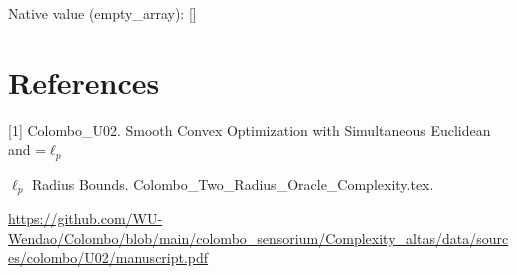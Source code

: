 \documentclass[10pt,a4paper]{article}
\newcommand{\AtlasMath}[1]{\par\begingroup\centering\setbox0=\hbox{$\displaystyle #1$}\ifdim\wd0>1.4\linewidth\typeout{ATLAS WIDE FORMULA: \the\wd0}\fi\ifdim\wd0>\linewidth\resizebox{\linewidth}{!}{\box0}\else\box0\fi\par\endgroup}
\newcommand{\AtlasInlineMath}[1]{\begingroup\setbox0=\hbox{$#1$}\ifdim\wd0>.4\linewidth\endgroup\AtlasMath{#1}\else\endgroup$#1$\fi}
\begin{document}
Native value (empty\_array): []



\section{References}


[1] Colombo\_U02. Smooth Convex Optimization with Simultaneous Euclidean and \AtlasInlineMath{\ell_p} Radius Bounds. Colombo\_Two\_Radius\_Oracl\allowbreak{}e\_Complexity.tex.



\url{https://github.com/WU-Wendao/Colombo/blob/main/colombo_sensorium/Complexity_altas/data/sources/colombo/U02/manuscript.pdf}
\end{document}
